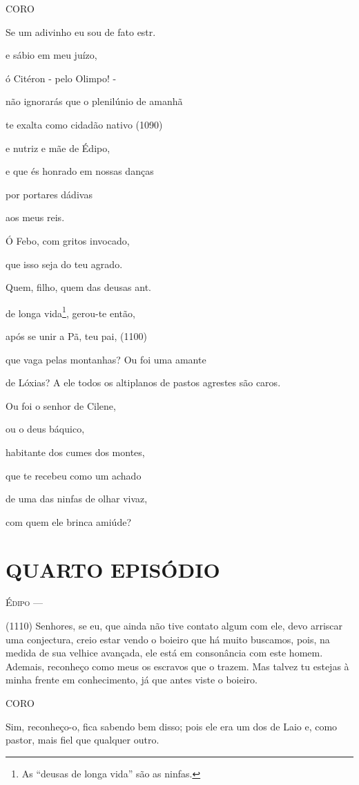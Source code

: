 \textsc{CORO}

Se um adivinho eu sou de fato estr.

e sábio em meu juízo,

ó Citéron - pelo Olimpo! -

não ignorarás que o plenilúnio de amanhã

te exalta como cidadão nativo (1090)

e nutriz e mãe de Édipo,

e que és honrado em nossas danças

por portares dádivas

aos meus reis.

Ó Febo, com gritos invocado,

que isso seja do teu agrado.

Quem, filho, quem das deusas ant.

de longa vida\footnote{As ``deusas de longa vida'' são as ninfas.},
gerou-te então,

após se unir a Pã, teu pai, (1100)

que vaga pelas montanhas? Ou foi uma amante

de Lóxias? A ele todos os altiplanos de pastos agrestes são caros.

Ou foi o senhor de Cilene,

ou o deus báquico,

habitante dos cumes dos montes,

que te recebeu como um achado

de uma das ninfas de olhar vivaz,

com quem ele brinca amiúde?

\section{QUARTO EPISÓDIO}

\textsc{Édipo} ---

(1110) Senhores, se eu, que ainda não tive contato algum com ele, devo
arriscar uma conjectura, creio estar vendo o boieiro que há muito
buscamos, pois, na medida de sua velhice avançada, ele está em
consonância com este homem. Ademais, reconheço como meus os escravos que
o trazem. Mas talvez tu estejas à minha frente em conhecimento, já que
antes viste o boieiro.

\textsc{CORO}

Sim, reconheço-o, fica sabendo bem disso; pois ele era um dos de Laio e,
como pastor, mais fiel que qualquer outro.


